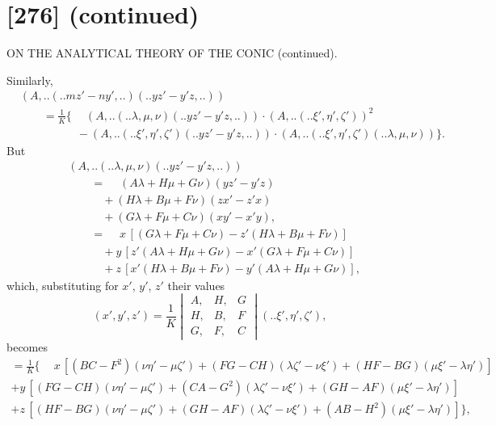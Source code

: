\documentclass[12pt,a4paper]{article}
\newcommand{\qform}[2]{(#1 \mathbin{..} #2)}
\theoremstyle{definition}
\begin{document}
\newpage
\section*{[276] (continued)}
\begin{center}
{\large ON THE ANALYTICAL THEORY OF THE CONIC (continued).}
\end{center}

Similarly,
\begin{align*}
&(A,..\!\qform{}{mz' - ny',..}\!\qform{}{yz' - y'z,..})\\
&\qquad = \frac{1}{K}\Big\{\phantom{-}(A,..\!\qform{}{\lambda, \mu, \nu}\!\qform{}{yz' - y'z,..}) \cdot (A,..\!\qform{}{\xi', \eta', \zeta'})^{2}\\
&\qquad\qquad\quad - (A,..\!\qform{}{\xi', \eta', \zeta'}\!\qform{}{yz' - y'z,..}) \cdot (A,..\!\qform{}{\xi', \eta', \zeta'}\!\qform{}{\lambda, \mu, \nu}) \Big\}.
\end{align*}
But
\begin{align*}
&(A,..\!\qform{}{\lambda, \mu, \nu}\!\qform{}{yz' - y'z,..})\\
&\qquad = \phantom{+} (A\lambda + H\mu + G\nu)(yz' - y'z)\\
&\qquad\quad + (H\lambda + B\mu + F\nu)(zx' - z'x)\\
&\qquad\quad + (G\lambda + F\mu + C\nu)(xy' - x'y),\\
&\qquad = \phantom{+} x\,[(G\lambda + F\mu + C\nu) - z'(H\lambda + B\mu + F\nu)]\\
&\qquad\quad + y\,[z'(A\lambda + H\mu + G\nu) - x'(G\lambda + F\mu + C\nu)]\\
&\qquad\quad + z\,[x'(H\lambda + B\mu + F\nu) - y'(A\lambda + H\mu + G\nu)],
\end{align*}
which, substituting for $x'$, $y'$, $z'$ their values
\[
(x', y', z') = \frac{1}{K}
\begin{vmatrix}
A, & H, & G \\
H, & B, & F \\
G, & F, & C
\end{vmatrix}
\!\qform{}{\xi', \eta', \zeta'},
\]
becomes
\begin{multline*}
= \frac{1}{K}\Big\{\phantom{+} x\,[(BC - F^{2})(\nu\eta' - \mu\zeta') + (FG - CH)(\lambda\zeta' - \nu\xi') + (HF - BG)(\mu\xi' - \lambda\eta')]\\
+ y\,[(FG - CH)(\nu\eta' - \mu\zeta') + (CA - G^{2})(\lambda\zeta' - \nu\xi') + (GH - AF)(\mu\xi' - \lambda\eta')]\\
+ z\,[(HF - BG)(\nu\eta' - \mu\zeta') + (GH - AF)(\lambda\zeta' - \nu\xi') + (AB - H^{2})(\mu\xi' - \lambda\eta')]\Big\},
\end{multline*}
\end{document}
